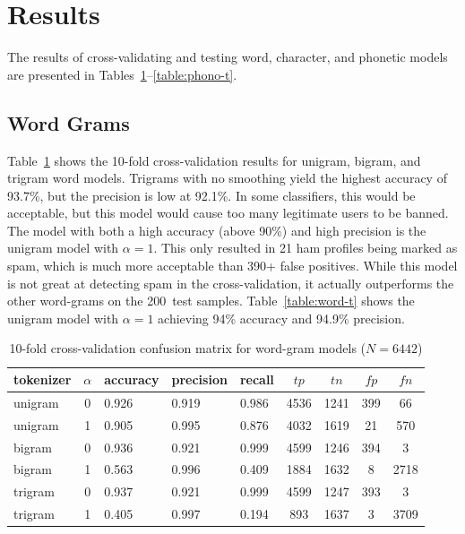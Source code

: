 \documentclass[10pt]{article}
\def \corpusSize {6442}
\def \testSize {200}
\begin{document}
\section{Results}

The results of cross-validating and testing word, character, and phonetic
models are presented in Tables~\ref{table:word-cv}--\ref{table:phono-t}.

\subsection{Word Grams}

Table~\ref{table:word-cv} shows the 10-fold cross-validation results for
unigram, bigram, and trigram word models. Trigrams with no smoothing yield the
highest accuracy of 93.7\%, but the precision is low at 92.1\%. In some
classifiers, this would be acceptable, but this model would cause too many
legitimate users to be banned. The model with both a high accuracy (above
90\%) and high precision is the unigram model with $\alpha = 1$. This only
resulted in 21 ham profiles being marked as spam, which is much more
acceptable than 390+ false positives. While this model is not great at
detecting spam in the cross-validation, it actually outperforms the other
word-grams on the \testSize\ test samples. Table~\ref{table:word-t} shows the
unigram model with $\alpha=1$ achieving 94\% accuracy and 94.9\% precision.

\begin{table}[t]
  \centering
  \caption{10-fold cross-validation confusion matrix for word-gram models ($N = \corpusSize$)}
  \label{table:word-cv}
  \begin{tabular}{lclllcccc}
    \toprule
    tokenizer & $\alpha$ & accuracy & precision & recall & $tp$ & $tn$ & $fp$ & $fn$ \\ \midrule
    unigram & 0 & 0.926 & 0.919 & 0.986 & 4536 & 1241 & 399 & 66 \\
    unigram & 1 & 0.905 & 0.995 & 0.876 & 4032 & 1619 & 21 & 570 \\
    bigram & 0 & 0.936 & 0.921 & 0.999 & 4599 & 1246 & 394 & 3 \\
    bigram & 1 & 0.563 & 0.996 & 0.409 & 1884 & 1632 & 8 & 2718 \\
    trigram & 0 & 0.937 & 0.921 & 0.999 & 4599 & 1247 & 393 & 3 \\
    trigram & 1 & 0.405 & 0.997 & 0.194 & 893 & 1637 & 3 & 3709 \\
    \bottomrule
  \end{tabular}
\end{table}
\end{document}
